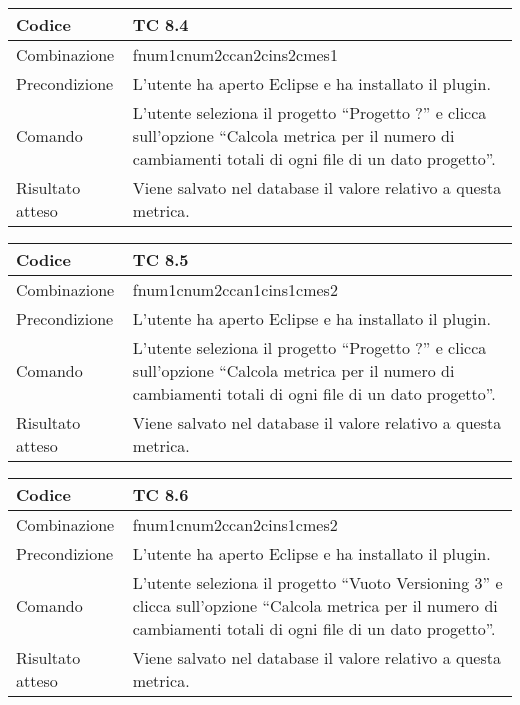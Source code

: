 \begin{table}[ht]
\begin{tabular}{|p{3cm}|p{9cm}|}
\hline
\cellcolor{lightgray}Codice				& TC 8.4								\\
\hline
\cellcolor{lightgray}Combinazione		& fnum1cnum2ccan2cins2cmes1									\\
\hline
\cellcolor{lightgray}Precondizione		& L'utente ha aperto Eclipse e ha installato il plugin.		\\
\hline
\cellcolor{lightgray}Comando			& L'utente seleziona il progetto ``Progetto ?''  e clicca sull'opzione ``Calcola metrica per il numero di cambiamenti totali di ogni file di un dato progetto''.	\\
\hline
\cellcolor{lightgray}Risultato atteso	& Viene salvato nel database il valore relativo a questa metrica.\\
\hline
\end{tabular}
\end{table}

\begin{table}[ht]
\begin{tabular}{|p{3cm}|p{9cm}|}
\hline
\cellcolor{lightgray}Codice				& TC 8.5								\\
\hline
\cellcolor{lightgray}Combinazione		& fnum1cnum2ccan1cins1cmes2									\\
\hline
\cellcolor{lightgray}Precondizione		& L'utente ha aperto Eclipse e ha installato il plugin.		\\
\hline
\cellcolor{lightgray}Comando			& L'utente seleziona il progetto ``Progetto ?''  e clicca sull'opzione ``Calcola metrica per il numero di cambiamenti totali di ogni file di un dato progetto''.	\\
\hline
\cellcolor{lightgray}Risultato atteso	& Viene salvato nel database il valore relativo a questa metrica.\\
\hline
\end{tabular}
\end{table}

\begin{table}[ht]
\begin{tabular}{|p{3cm}|p{9cm}|}
\hline
\cellcolor{lightgray}Codice				& TC 8.6								\\
\hline
\cellcolor{lightgray}Combinazione		& fnum1cnum2ccan2cins1cmes2									\\
\hline
\cellcolor{lightgray}Precondizione		& L'utente ha aperto Eclipse e ha installato il plugin.		\\
\hline
\cellcolor{lightgray}Comando			& L'utente seleziona il progetto ``Vuoto Versioning 3''  e clicca sull'opzione ``Calcola metrica per il numero di cambiamenti totali di ogni file di un dato progetto''.	\\
\hline
\cellcolor{lightgray}Risultato atteso	& Viene salvato nel database il valore relativo a questa metrica.\\
\hline
\end{tabular}
\end{table}

